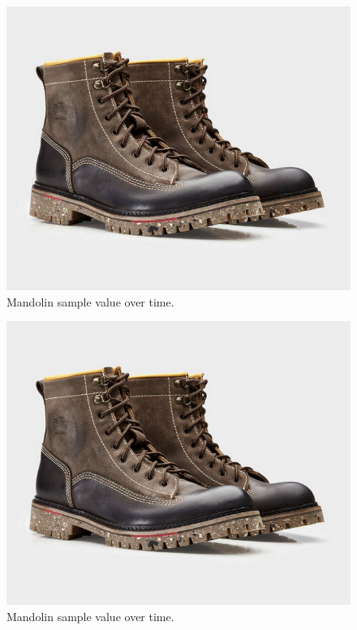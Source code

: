 \documentclass{article}
\begin{document}
        \begin{figure}[h]
            \includegraphics[scale=0.25]{images/placeholder.png}%
            \centering
            \caption{Mandolin sample value over time.}
            \label{specMando1}
        \end{figure}
        \begin{figure}[h]
            \includegraphics[scale=0.25]{images/placeholder.png}%
            \centering
            \caption{Mandolin sample value over time.}
            \label{specWaterfallMando1}
        \end{figure}
\end{document}
